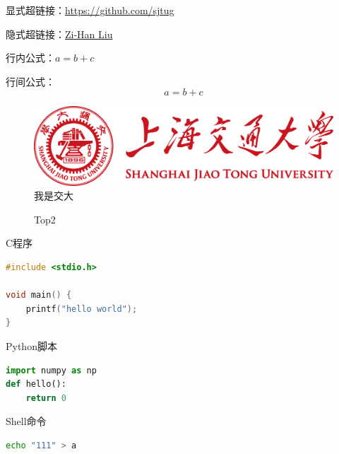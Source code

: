 \documentclass{ctexart}
\begin{document}
显式超链接：\url{https://github.com/sjtug}

隐式超链接：\href{https://github.com/zhliuworks}{Zi-Han Liu}

行内公式：$a=b+c$

行间公式：\[a=b+c\]

\begin{figure}[H]
\centering
\includegraphics[scale=0.5]{./imgs/sjtu.png} %
\caption{我是交大}
\end{figure}

\begin{figure}[H]
\centering
{}
\qquad
{}
\caption{Top2}
\end{figure}

\noindent C程序
\begin{lstlisting}[language=C]
#include <stdio.h>

void main() {
	printf("hello world");
}
\end{lstlisting}

\noindent Python脚本
\begin{lstlisting}[language=Python]
import numpy as np
def hello():
	return 0
\end{lstlisting}

\noindent Shell命令
\begin{lstlisting}[language=Bash,numbers=none]
echo "111" > a
\end{lstlisting}
\end{document}

